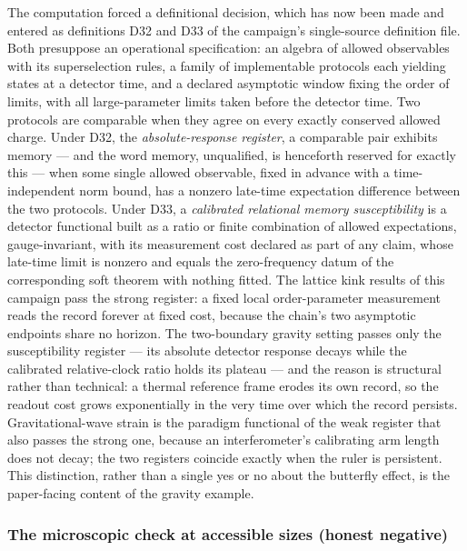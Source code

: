 The computation forced a definitional decision, which has now been made
and entered as definitions D32 and D33 of the campaign's single-source
definition file.  Both presuppose an operational specification: an
algebra of allowed observables with its superselection rules, a family of
implementable protocols each yielding states at a detector time, and a
declared asymptotic window fixing the order of limits, with all
large-parameter limits taken before the detector time.  Two protocols are
comparable when they agree on every exactly conserved allowed charge.
Under D32, the \emph{absolute-response register}, a comparable pair
exhibits memory --- and the word memory, unqualified, is henceforth
reserved for exactly this --- when some single allowed observable, fixed
in advance with a time-independent norm bound, has a nonzero late-time
expectation difference between the two protocols.  Under D33, a
\emph{calibrated relational memory susceptibility} is a detector
functional built as a ratio or finite combination of allowed
expectations, gauge-invariant, with its measurement cost declared as part
of any claim, whose late-time limit is nonzero and equals the
zero-frequency datum of the corresponding soft theorem with nothing
fitted.  The lattice kink results of this campaign pass the strong
register: a fixed local order-parameter measurement reads the record
forever at fixed cost, because the chain's two asymptotic endpoints share
no horizon.  The two-boundary gravity setting passes only the
susceptibility register --- its absolute detector response decays while
the calibrated relative-clock ratio holds its plateau --- and the reason
is structural rather than technical: a thermal reference frame erodes its
own record, so the readout cost grows exponentially in the very time over
which the record persists.  Gravitational-wave strain is the paradigm
functional of the weak register that also passes the strong one, because
an interferometer's calibrating arm length does not decay; the two
registers coincide exactly when the ruler is persistent.  This
distinction, rather than a single yes or no about the butterfly effect,
is the paper-facing content of the gravity example.

\subsubsection*{The microscopic check at accessible sizes (honest negative)}

